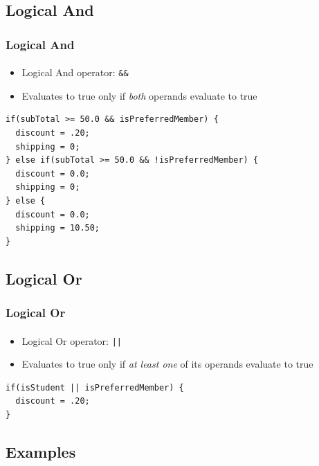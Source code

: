 \documentclass[]{beamer}
\begin{document}
\subsection{Logical And}

\begin{frame}[fragile]
  \frametitle{Logical And}
  \framesubtitle{}
  
\begin{itemize}[<+->]
  \item Logical And operator: \texttt{&&}
  \item Evaluates to true only if \emph{both} operands evaluate to true
\end{itemize}

\begin{overprint}
\begin{verbatim}
if(subTotal >= 50.0 && isPreferredMember) {
  discount = .20;
  shipping = 0;
} else if(subTotal >= 50.0 && !isPreferredMember) {
  discount = 0.0;
  shipping = 0;
} else {
  discount = 0.0;
  shipping = 10.50;
}
\end{verbatim}
\end{overprint}
\end{frame}

\subsection{Logical Or}

\begin{frame}[fragile]
  \frametitle{Logical Or}
  \framesubtitle{}
  
\begin{itemize}[<+->]
  \item Logical Or operator: \texttt{||}
  \item Evaluates to true only if \emph{at least one} of its operands evaluate to true
\end{itemize}

\begin{overprint}
\begin{verbatim}
if(isStudent || isPreferredMember) {
  discount = .20;
}
\end{verbatim}
\end{overprint}

\end{frame}

\subsection{Examples}
\end{document}
